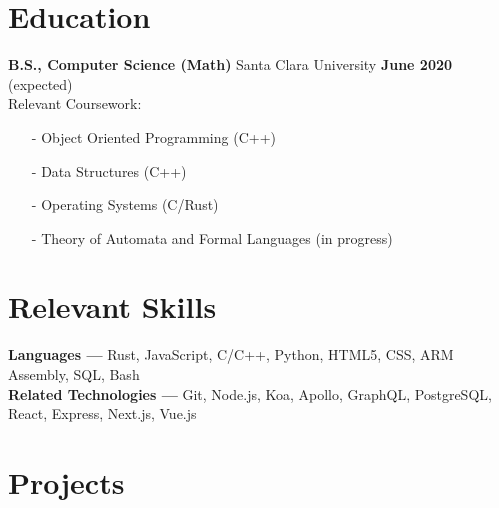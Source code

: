 \documentclass[margin,line]{res}
\begin{document}
\newcommand{\myname}{Derrick Lee}
\newlength{\mynamewidth}
\settowidth{\mynamewidth}{\namefont\myname}

\name{\hspace*{0.5\textwidth}\hspace{-0.5\mynamewidth} \myname \vspace*{.1in}}
\thispagestyle{empty}

\begin{resume}




\section{\sc Education}
{\bf B.S., Computer Science (Math)} Santa Clara University \hfill {\bf June 2020} (expected)\\
Relevant Coursework:
\begin{itemize} \itemsep -2pt
  \item[-] Object Oriented Programming (C++)
  \item[-] Data Structures (C++)
  \item[-] Operating Systems (C/Rust)
  \item[-] Theory of Automata and Formal Languages (in progress)
\end{itemize}

\vspace{-1em}

\section{\sc Relevant Skills}
  {\bf Languages ---}
  Rust, JavaScript, C/C++, Python, HTML5, CSS, ARM Assembly, SQL, Bash \\
  {\bf Related Technologies ---}
  Git, Node.js, Koa, Apollo, GraphQL, PostgreSQL, React, Express, Next.js, Vue.js	

\section{\sc Projects}


\end{resume}
\end{document}

